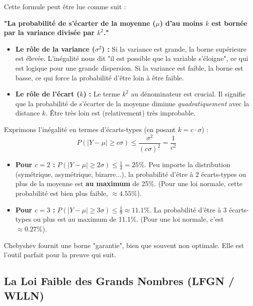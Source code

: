 \begin{intuitionbox}
Cette formule peut être lue comme suit :

\textbf{"La probabilité de s'écarter de la moyenne ($\mu$) d'au moins $k$ est bornée par la variance divisée par $k^2$."}

\begin{itemize}
    \item \textbf{Le rôle de la variance ($\sigma^2$) :} Si la variance est grande, la borne supérieure est élevée. L'inégalité nous dit "il est possible que la variable s'éloigne", ce qui est logique pour une grande dispersion. Si la variance est faible, la borne est basse, ce qui force la probabilité d'être loin à être faible.
    \item \textbf{Le rôle de l'écart ($k$) :} Le terme $k^2$ au dénominateur est crucial. Il signifie que la probabilité de s'écarter de la moyenne diminue \textit{quadratiquement} avec la distance $k$. Être très loin est (relativement) très improbable.
\end{itemize}
\end{intuitionbox}

\begin{examplebox}
Exprimons l'inégalité en termes d'écarts-types (en posant $k = c \cdot \sigma$) :
$$ P(|Y - \mu| \ge c\sigma) \le \frac{\sigma^2}{(c\sigma)^2} = \frac{1}{c^2} $$

\begin{itemize}
    \item \textbf{Pour $c=2$ :} $P(|Y - \mu| \ge 2\sigma) \le \frac{1}{4} = 25\%$.
    Peu importe la distribution (symétrique, asymétrique, bizarre...), la probabilité d'être à 2 écarts-types ou plus de la moyenne est \textbf{au maximum} de 25\%. (Pour une loi normale, cette probabilité est bien plus faible, $\approx 4.55\%$).
    
    \item \textbf{Pour $c=3$ :} $P(|Y - \mu| \ge 3\sigma) \le \frac{1}{9} \approx 11.1\%$.
    La probabilité d'être à 3 écarts-types ou plus est au maximum de 11.1\%. (Pour une loi normale, c'est $\approx 0.27\%$).
\end{itemize}
Chebyshev fournit une borne "garantie", bien que souvent non optimale. Elle est l'outil parfait pour la preuve qui suit.
\end{examplebox}


\subsection{La Loi Faible des Grands Nombres (LFGN / WLLN)}

